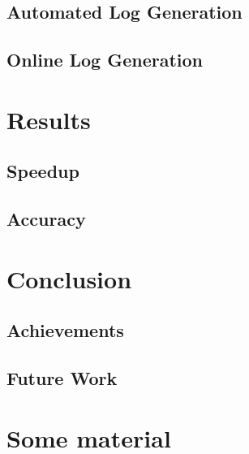 \documentclass[mscthesis]{usiinfthesis}
\begin{document}
\section{Automated Log Generation}
\label{ch:test_alog}
\section{Online Log Generation}
\label{ch:test_olog}

\chapter{Results}
\label{ch:res}
\section{Speedup}
\label{ch:res_speed}
\section{Accuracy}
\label{ch:res_prec}

\chapter{Conclusion}
\label{ch:conc}
\section{Achievements}
\label{ch:conc_ach}
\section{Future Work}
\label{ch:conc_work}

\nocite{*}

\appendix %

\chapter{Some material}
\end{document}
